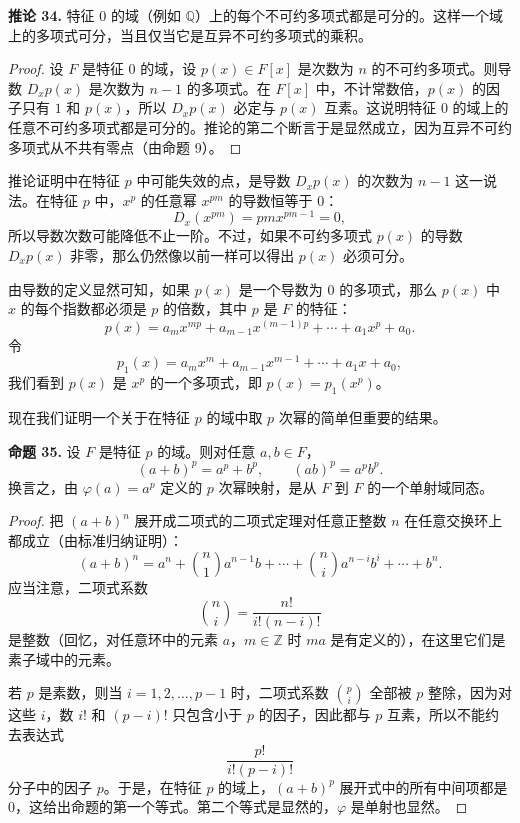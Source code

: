 \noindent\textbf{推论 34.} 特征 $0$ 的域（例如 $\mathbb Q$）上的每个不可约多项式都是可分的。这样一个域上的多项式可分，当且仅当它是互异不可约多项式的乘积。

\begin{proof}
	设 $F$ 是特征 $0$ 的域，设 $p(x)\in F[x]$ 是次数为 $n$ 的不可约多项式。则导数 $D_xp(x)$ 是次数为 $n-1$ 的多项式。在 $F[x]$ 中，不计常数倍，$p(x)$ 的因子只有 $1$ 和 $p(x)$，所以 $D_xp(x)$ 必定与 $p(x)$ 互素。这说明特征 $0$ 的域上的任意不可约多项式都是可分的。推论的第二个断言于是显然成立，因为互异不可约多项式从不共有零点（由命题 9）。
\end{proof}

推论证明中在特征 $p$ 中可能失效的点，是导数 $D_xp(x)$ 的次数为 $n-1$ 这一说法。在特征 $p$ 中，$x^p$ 的任意幂 $x^{pm}$ 的导数恒等于 $0$：
\[
D_x(x^{pm})=pmx^{pm-1}=0,
\]
所以导数次数可能降低不止一阶。不过，如果不可约多项式 $p(x)$ 的导数 $D_xp(x)$ 非零，那么仍然像以前一样可以得出 $p(x)$ 必须可分。

由导数的定义显然可知，如果 $p(x)$ 是一个导数为 $0$ 的多项式，那么 $p(x)$ 中 $x$ 的每个指数都必须是 $p$ 的倍数，其中 $p$ 是 $F$ 的特征：
\[
p(x)=a_mx^{mp}+a_{m-1}x^{(m-1)p}+\cdots+a_1x^p+a_0.
\]
令
\[
p_1(x)=a_mx^m+a_{m-1}x^{m-1}+\cdots+a_1x+a_0,
\]
我们看到 $p(x)$ 是 $x^p$ 的一个多项式，即 $p(x)=p_1(x^p)$。

现在我们证明一个关于在特征 $p$ 的域中取 $p$ 次幂的简单但重要的结果。

\noindent\textbf{命题 35.} 设 $F$ 是特征 $p$ 的域。则对任意 $a,b\in F$，
\[
(a+b)^p=a^p+b^p,
\qquad
(ab)^p=a^pb^p.
\]
换言之，由 $\varphi(a)=a^p$ 定义的 $p$ 次幂映射，是从 $F$ 到 $F$ 的一个单射域同态。

\begin{proof}
	把 $(a+b)^n$ 展开成二项式的二项式定理对任意正整数 $n$ 在任意交换环上都成立（由标准归纳证明）：
	\[
	(a+b)^n=a^n+\binom n1a^{n-1}b+\cdots+\binom ni a^{n-i}b^i+\cdots+b^n.
	\]
	应当注意，二项式系数
	\[
	\binom ni=\frac{n!}{i!(n-i)!}
	\]
	是整数（回忆，对任意环中的元素 $a$，$m\in\mathbb Z$ 时 $ma$ 是有定义的），在这里它们是素子域中的元素。
	
	若 $p$ 是素数，则当 $i=1,2,\ldots,p-1$ 时，二项式系数 $\binom pi$ 全部被 $p$ 整除，因为对这些 $i$，数 $i!$ 和 $(p-i)!$ 只包含小于 $p$ 的因子，因此都与 $p$ 互素，所以不能约去表达式
	\[
	\frac{p!}{i!(p-i)!}
	\]
	分子中的因子 $p$。于是，在特征 $p$ 的域上，$(a+b)^p$ 展开式中的所有中间项都是 $0$，这给出命题的第一个等式。第二个等式是显然的，$\varphi$ 是单射也显然。
\end{proof}

